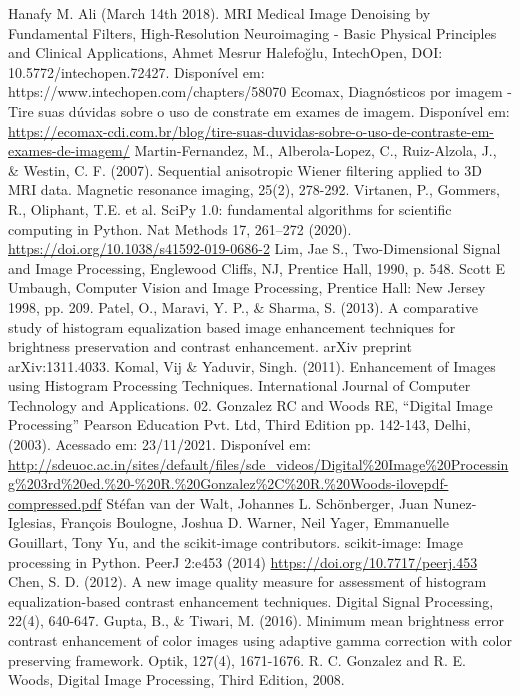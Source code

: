 \documentclass[conference]{IEEEtran}
\begin{document}
\begin{thebibliography}{00}
 Hanafy M. Ali (March 14th 2018). MRI Medical Image Denoising by Fundamental Filters, High-Resolution Neuroimaging - Basic Physical Principles and Clinical Applications, Ahmet Mesrur Halefoğlu, IntechOpen, DOI: 10.5772/intechopen.72427. Disponível em: https://www.intechopen.com/chapters/58070
 Ecomax, Diagnósticos por imagem - Tire suas dúvidas sobre o uso de constrate em exames de imagem. Disponível em: \url{https://ecomax-cdi.com.br/blog/tire-suas-duvidas-sobre-o-uso-de-contraste-em-exames-de-imagem/}
 Martin-Fernandez, M., Alberola-Lopez, C., Ruiz-Alzola, J., \& Westin, C. F. (2007). Sequential anisotropic Wiener filtering applied to 3D MRI data. Magnetic resonance imaging, 25(2), 278-292.
 Virtanen, P., Gommers, R., Oliphant, T.E. et al. SciPy 1.0: fundamental algorithms for scientific computing in Python. Nat Methods 17, 261–272 (2020). \url{https://doi.org/10.1038/s41592-019-0686-2}
 Lim, Jae S., Two-Dimensional Signal and Image Processing, Englewood Cliffs, NJ, Prentice Hall, 1990, p. 548.
 Scott E Umbaugh, Computer Vision and Image Processing, Prentice Hall: New Jersey 1998, pp. 209.
 Patel, O., Maravi, Y. P., \& Sharma, S. (2013). A comparative study of histogram equalization based image enhancement techniques for brightness preservation and contrast enhancement. arXiv preprint arXiv:1311.4033.
 Komal, Vij \& Yaduvir, Singh. (2011). Enhancement of Images using Histogram Processing Techniques. International Journal of Computer Technology and Applications. 02.
 Gonzalez RC and Woods RE, “Digital Image Processing” Pearson Education Pvt. Ltd, Third Edition pp. 142-143, Delhi, (2003). Acessado em: 23/11/2021. Disponível em: \url{http://sdeuoc.ac.in/sites/default/files/sde_videos/Digital%20Image%20Processing%203rd%20ed.%20-%20R.%20Gonzalez%2C%20R.%20Woods-ilovepdf-compressed.pdf}
 Stéfan van der Walt, Johannes L. Schönberger, Juan Nunez-Iglesias, François Boulogne, Joshua D. Warner, Neil Yager, Emmanuelle Gouillart, Tony Yu, and the scikit-image contributors. scikit-image: Image processing in Python. PeerJ 2:e453 (2014) \url{https://doi.org/10.7717/peerj.453}
 Chen, S. D. (2012). A new image quality measure for assessment of histogram equalization-based contrast enhancement techniques. Digital Signal Processing, 22(4), 640-647.
 Gupta, B., \& Tiwari, M. (2016). Minimum mean brightness error contrast enhancement of color images using adaptive gamma correction with color preserving framework. Optik, 127(4), 1671-1676.
 R. C. Gonzalez and R. E. Woods, Digital Image Processing, Third Edition,
2008.
\end{thebibliography}
\vspace{12pt}
\end{document}
